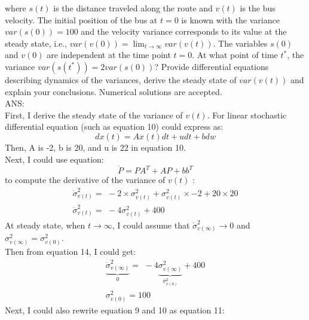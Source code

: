 \documentclass{article}
\begin{document}
\noindent where $s(t)$ is the distance traveled along the route and $v(t)$ is the bus velocity. The initial position of the bus at $t = 0$ is known with the variance $var(s(0)) =100$ and the velocity variance corresponds to its value at the steady state, i.e.,
$var(v(0)) = \lim_{t \rightarrow \infty} var(v(t))$. The variables $s(0)$ and $v(0)$ are 
independent at the time point $t = 0$. At what point of time $t^*$, the variance $var(s(t^*)) = 2var(s(0))$? Provide differential equations describing dynamics of the variances, derive the steady state of $var(v(t))$ and explain your conclusions. Numerical solutions are accepted.\\
ANS:\\
First, I derive the steady state of the variance of $v(t)$. For linear stochastic differential equation (such as equation 10) could express as:\\
\begin{equation}
	dx(t) = Ax(t)dt + udt + bdw
\end{equation}
Then, A is -2, b is 20, and u is 22 in equation 10.\\
Next, I could use equation:\\
\begin{equation}
	\dot P = PA^T  + AP + bb^T 
\end{equation}
to compute the derivative of the variance of $v(t)$ :
\begin{eqnarray}
	\dot \sigma _{v(t)}^2  = \,\, - 2 \times \sigma _{v(t)}^2  + \sigma _{v(t)}^2  \times  - 2 + 20 \times 20\\
	\dot \sigma _{v(t)}^2  = \,\, - 4\sigma _{v(t)}^2  + 400
\end{eqnarray}
At steady state, when $t \to \infty$, I could  assume that $\dot \sigma _{v(\infty )}^2  \to 0$ and $\sigma _{v(\infty )}^2  = \sigma _{v(0)}^2$.\\
Then from equation 14, I could get:
\begin{eqnarray}
	\underbrace {\dot \sigma _{v(\infty )}^2 }_0 = \,\, - 4\underbrace {\sigma _{v(\infty )}^2 }_{\sigma _{v(0)}^2 } + 400\\
	\sigma _{v(0)}^2  = 100
\end{eqnarray}
Next, I could also rewrite equation 9 and 10 as equation 11:
\end{document}
